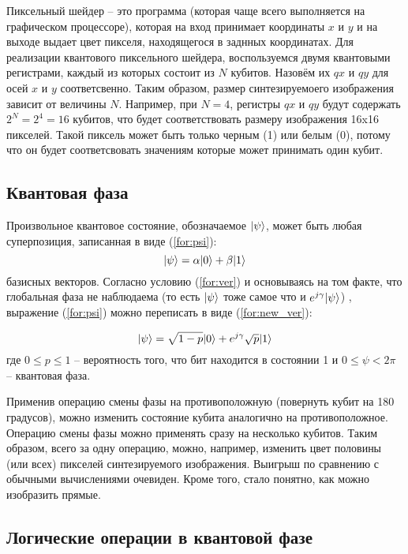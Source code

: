 Пиксельный шейдер -- это программа (которая чаще всего выполняется на графическом процессоре), которая на вход принимает координаты $x$ и $y$ и на выходе выдает цвет пикселя, находящегося в заднных координатах. Для реализации квантового пиксельного шейдера, воспользуемся двумя квантовыми регистрами, каждый из которых состоит из $N$ кубитов. Назовём их $qx$ и $qy$ для осей $x$ и $y$ соответсвенно. Таким образом, размер синтезируемоего изображения зависит от величины $N$. Например, при $N = 4$, регистры $qx$ и $qy$ будут содержать $2^N = 2^4 = 16$ кубитов, что будет соответствовать размеру изображения 16x16 пикселей. Такой пиксель может быть только черным (1) или белым (0), потому что он будет соответсвовать значениям которые может принимать один кубит. 

\subsection{Квантовая фаза}

Произвольное квантовое состояние, обозначаемое $\lvert\psi\rangle$, может быть любая суперпозиция, записанная в виде (\ref{for:psi}):
\begin{equation}
\label{for:psi}
\lvert\psi\rangle = \alpha\lvert0\rangle + \beta\lvert1\rangle
\end{equation}
 базисных векторов. Согласно условию (\ref{for:ver}) и основываясь на том факте, что глобальная фаза не наблюдаема (то есть $\lvert\psi\rangle$ тоже самое что и $e^{j\gamma}\lvert\psi\rangle$) \cite{global-phase}, выражение (\ref{for:psi}) можно переписать в виде (\ref{for:new_ver}):
 
\begin{equation} 
\label{for:new_ver}
\lvert\psi\rangle = \sqrt{1 - p}\lvert0\rangle + e^{j\gamma}\sqrt{p}\lvert1\rangle
\end{equation} где $0 \leq p \leq 1$ -- вероятность того, что бит находится в состоянии 1 и $0 \leq \psi < 2\pi$ -- квантовая фаза.

Применив операцию смены фазы на противоположную (повернуть кубит на 180 градусов), можно изменить состояние кубита аналогично на противоположное. Операцию смены фазы можно применять сразу на несколько кубитов. Таким образом, всего за одну операцию, можно, например, изменить цвет половины (или всех) пикселей синтезируемого изображения. Выигрыш по сравнению с обычными вычислениями очевиден. Кроме того, стало понятно, как можно изобразить прямые. 

\subsection{Логические операции в квантовой фазе}

